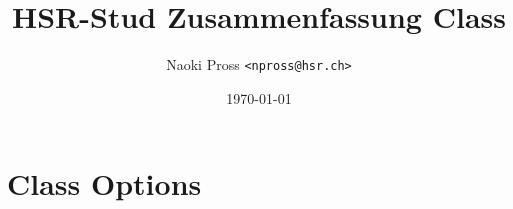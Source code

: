 \documentclass{hsrzf}
\title{HSR-Stud Zusammenfassung Class}
\author{Naoki Pross \texttt{<npross@hsr.ch>}}
\date{\today}
\begin{document}
\maketitle

\section{Class Options}
\end{document}

